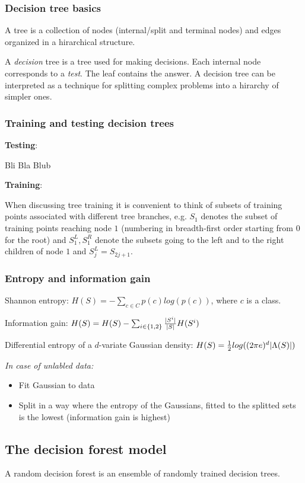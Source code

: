 \documentclass{scrartcl}
\DeclarePairedDelimiter\abs{\lvert}{\rvert}%
\begin{document}
\begin{appendices}
\subsubsection{Decision tree basics}
A tree is a collection of nodes (internal/split and terminal nodes) and edges organized in a hirarchical structure.

A \textit{decision} tree is a tree used for making decisions. Each internal node corresponds to a \textit{test}. The leaf contains the answer. A decision tree can be interpreted as a technique for splitting complex problems into a hirarchy of simpler ones.

\subsubsection{Training and testing decision trees}
\textbf{Testing}:

Bli Bla Blub

\bigbreak

\textbf{Training}:

When discussing tree training it is convenient to think of subsets of training points associated with different tree branches, e.g. \(S_1\) denotes the subset of training points reaching node \(1\) (numbering in breadth-first order starting from 0 for the root) and \(S_1^L, S_1^R\) denote the subsets going to the left and to the right children of node \(1\) and \(S_j^L = S_{2j+1}\).

\subsubsection{Entropy and information gain}
Shannon entropy: \(H(S) = - \sum_{c \in C} p(c) log (p(c))\), where \(c\) is a class.

Information gain: \(H(S) = H(S) - \sum_{i \in \{1,2\}} \frac{\abs{S^i}}{\abs{S}} H(S^i)\)

Differential entropy of a \(d\)-variate Gaussian density: \(H(S) = \frac{1}{2} log((2 \pi e)^d\abs{\Lambda(S)})\)

\textit{In case of unlabled data:}
\begin{itemize}
    \item
        Fit Gaussian to data
    \item
        Split in a way where the entropy of the Gaussians, fitted to the splitted sets is the lowest (information gain is highest)
\end{itemize}

\subsection{The decision forest model}
A random decision forest is an ensemble of randomly trained decision trees.


\end{appendices}
\end{document}
